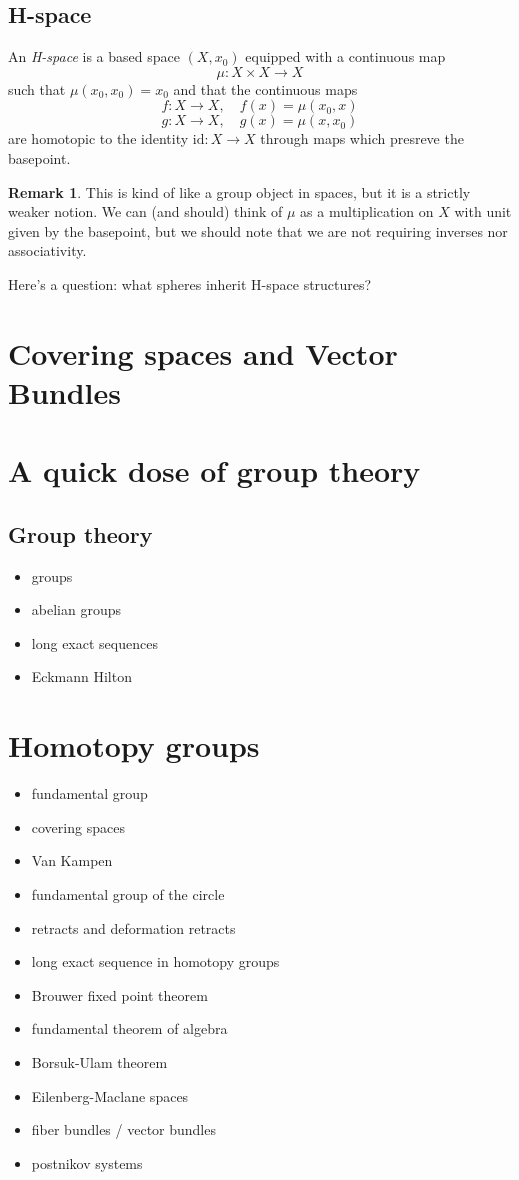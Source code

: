 \documentclass[10pt]{amsart}
\theoremstyle{definition}
\newtheorem{rmk}[thm]{Remark}
\newcommand{\cdef}[1]{\textcolor{Bittersweet}{#1}}
\begin{document}
\subsection{H-space}
An \cdef{\emph{H-space}} is a based space $(X, x_0)$ equipped with a continuous map
\[\mu:X \times X \to X\]
such that $\mu(x_0, x_0) = x_0$ and that the continuous maps
\[f:X \to X, \quad f(x) = \mu(x_0, x)\]
\[g:X \to X, \quad g(x) = \mu(x, x_0)\]
are homotopic to the identity $\text{id}:X \to X$ through maps which presreve the basepoint.

\begin{rmk}
    This is kind of like a group object in spaces, but it is a strictly weaker notion. We can (and should) think of $\mu$ as a multiplication on $X$ with unit given by the basepoint, but we should note that we are not requiring inverses nor associativity.
\end{rmk}

Here's a question: what spheres inherit H-space structures?


\section{Covering spaces and Vector Bundles}



\section{A quick dose of group theory}
\subsection{Group theory}
\begin{itemize}
    \item groups
    \item abelian groups
    \item long exact sequences
    \item Eckmann Hilton
\end{itemize}

\section{Homotopy groups}
\begin{itemize}
    \item fundamental group
    \item covering spaces
    \item Van Kampen
    \item fundamental group of the circle
    \item retracts and deformation retracts
    \item long exact sequence in homotopy groups
    \item Brouwer fixed point theorem
    \item fundamental theorem of algebra
    \item Borsuk-Ulam theorem
    \item Eilenberg-Maclane spaces
    \item fiber bundles / vector bundles
    \item postnikov systems
\end{itemize}
\end{document}
